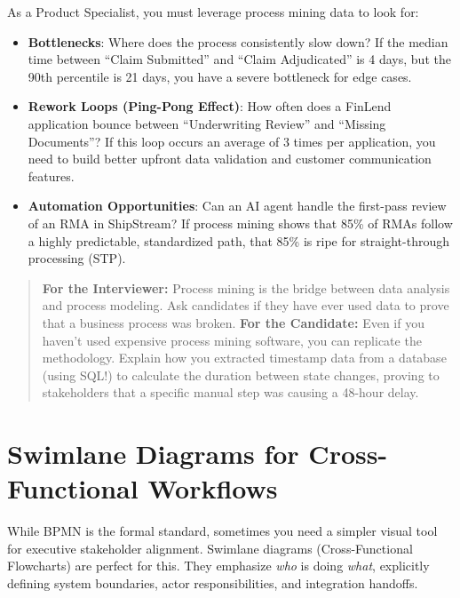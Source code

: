 As a Product Specialist, you must leverage process mining data to look
for:

\begin{itemize}
\tightlist
\item
  \textbf{Bottlenecks}: Where does the process consistently slow down?
  If the median time between ``Claim Submitted'' and ``Claim
  Adjudicated'' is 4 days, but the 90th percentile is 21 days, you have
  a severe bottleneck for edge cases.
\item
  \textbf{Rework Loops (Ping-Pong Effect)}: How often does a FinLend
  application bounce between ``Underwriting Review'' and ``Missing
  Documents''? If this loop occurs an average of 3 times per
  application, you need to build better upfront data validation and
  customer communication features.
\item
  \textbf{Automation Opportunities}: Can an AI agent handle the
  first-pass review of an RMA in ShipStream? If process mining shows
  that 85\% of RMAs follow a highly predictable, standardized path, that
  85\% is ripe for straight-through processing (STP).
\end{itemize}

\begin{quote}
\textbf{For the Interviewer:} Process mining is the bridge between data
analysis and process modeling. Ask candidates if they have ever used
data to prove that a business process was broken. \textbf{For the
Candidate:} Even if you haven't used expensive process mining software,
you can replicate the methodology. Explain how you extracted timestamp
data from a database (using SQL!) to calculate the duration between
state changes, proving to stakeholders that a specific manual step was
causing a 48-hour delay.
\end{quote}

\bigskip

\section{Swimlane Diagrams for Cross-Functional
Workflows}\label{swimlane-diagrams-for-cross-functional-workflows}

While BPMN is the formal standard, sometimes you need a simpler visual
tool for executive stakeholder alignment. Swimlane diagrams
(Cross-Functional Flowcharts) are perfect for this. They emphasize
\emph{who} is doing \emph{what}, explicitly defining system boundaries,
actor responsibilities, and integration handoffs.

